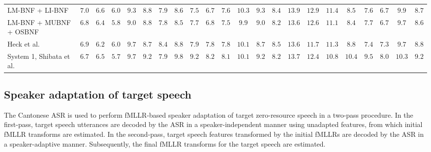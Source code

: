 \documentclass[a4paper]{article}
\begin{document}
\begin{table}[htbp]
{\begin{tabular}{lccc|ccc|ccc|c||ccc|ccc|ccc|c||c}
LM-BNF + LI-BNF & $7.0$& $6.6$& $6.0$& $9.3$& $\bm{8.8}$& $7.9$& $8.6$& $\bm{7.5}$& $\bm{6.7}$& $7.6$& $10.3$& $9.3$& $8.4$& $13.9$& $12.9$& $11.4$& $8.5$& $\bm{7.6}$& $\bm{6.7}$& $9.9$& $8.7$\\
LM-BNF + MUBNF + OSBNF & $\bm{6.8}$& $\bm{6.4}$& $\bm{5.8}$& $\bm{9.0}$& $\bm{8.8}$& $\bm{7.8}$& $\bm{8.5}$& $7.7$& $6.8$& $\bm{7.5}$& $\bm{9.9}$& $9.0$& $\bm{8.2}$& $\bm{13.6}$& $\bm{12.6}$& $\bm{11.1}$& $\bm{8.4}$& $7.7$& $\bm{6.7}$& $\bm{9.7}$& $\bm{8.6}$\\
\midrule 
Heck et al. \cite{heck2017feature} & $6.9$ & $6.2$ &$ 6.0$ &$ 9.7$ & $8.7 $&$ 8.4 $& $8.8 $&$ 7.9$ & $7.8 $&$ 7.8 $& $10.1$ & $8.7$ &$ 8.5 $&$ 13.6 $& $11.7$ &$ 11.3$ &$ 8.8 $& $7.4 $& $7.3 $& $9.7$ &$ 8.8$\\

System 1, Shibata et al.  \cite{shibata2017composite} & $6.7$ & $6.5$ & $5.7$ & $9.7 $& $9.2$ & $7.9$ & $9.8$ & $9.2$ & $8.2$ & $8.1$ & $10.1$ & $9.2$ & $8.2$ & $13.7$ & $12.4$ & $10.8$ & $10.4$ & $9.5$ & $8.0$ & $10.3$ & $9.2$ \\ 
\bottomrule
\end{tabular}%
}
\label{tab:abx_results}
\end{table}
\subsection{Speaker adaptation of target speech}
The Cantonese ASR is used to perform fMLLR-based speaker adaptation of target zero-resource speech in a two-pass procedure. 
In the first-pass, target speech utterances are decoded by the ASR in a speaker-independent manner using unadapted features, from which initial fMLLR transforms are estimated. 
In the second-pass, target speech features transformed by the initial fMLLRs are decoded by the ASR in a speaker-adaptive manner. Subsequently, the final fMLLR transforms for the target speech are estimated.
\end{document}
